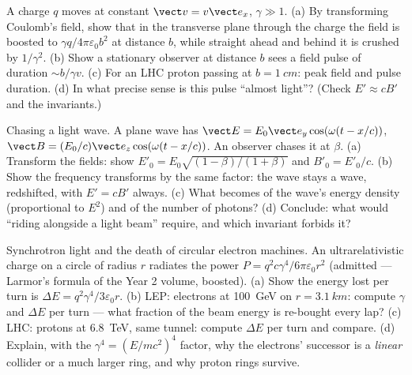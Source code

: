 \begin{exercise}[$\star\star$]\label{exo:b3:covariant-electromagnetism:9}
A charge $q$ moves at constant $\vect v = v\vect e_x$, $\gamma \gg
1$. (a) By transforming Coulomb's field, show that in the transverse
plane through the charge the field is boosted to $\gamma
q/4\pi\varepsilon_0b^2$ at distance $b$, while straight ahead and
behind it is crushed by $1/\gamma^2$. (b) Show a
stationary observer at distance $b$ sees a field pulse of duration
$\sim b/\gamma v$. (c) For an LHC proton passing at $b = \qty{1}{cm}$:
peak field and pulse duration. (d) In what precise sense is this
pulse ``almost light''? (Check $E' \approx cB'$ and the invariants.)
\end{exercise}

\begin{exercise}[$\star\star\star$]\label{exo:b3:covariant-electromagnetism:10}
Chasing a light wave. A plane wave has $\vect E = E_0\vect e_y
\cos(\omega(t - x/c))$, $\vect B = (E_0/c)\vect e_z\cos(\omega(t -
x/c))$. An observer chases it at $\beta$. (a) Transform the fields:
show $E'_0 = E_0\sqrt{(1-\beta)/(1+\beta)}$ and $B'_0 = E'_0/c$. (b)
Show the frequency transforms by the same factor: the wave stays a
wave, redshifted, with $E' = cB'$ always. (c) What becomes of the
wave's energy density (proportional to $E^2$) and of the number of
photons? (d) Conclude: what would ``riding alongside a light beam''
require, and which invariant forbids it?
\end{exercise}

\begin{exercise}[$\star\star\star$]\label{exo:b3:covariant-electromagnetism:11}
Synchrotron light and the death of circular electron machines. An
ultrarelativistic charge on a circle of radius $r$ radiates the power
$P = q^2c\gamma^4/6\pi\varepsilon_0r^2$ (admitted --- Larmor's
formula of the Year 2 volume, boosted). (a) Show the energy lost per
turn is $\Delta E = q^2\gamma^4/3\varepsilon_0r$. (b) LEP: electrons
at \qty{100}{GeV} on $r = \qty{3.1}{km}$: compute $\gamma$ and
$\Delta E$ per turn --- what fraction of the beam energy is re-bought
every lap? (c) LHC: protons at \qty{6.8}{TeV}, same tunnel: compute
$\Delta E$ per turn and compare. (d) Explain, with the $\gamma^4 =
(E/mc^2)^4$ factor, why the electrons' successor is a
\emph{linear} collider or a much larger ring, and why proton rings
survive.
\end{exercise}

